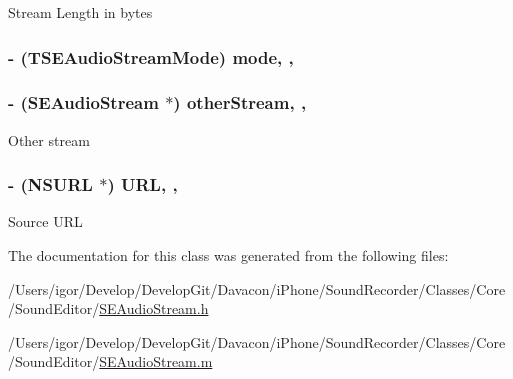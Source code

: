 Stream Length in bytes \hypertarget{interface_s_e_audio_stream_afde89d08f02ae01b1e9be3905942fb31}{
\subsubsection[{mode}]{\setlength{\rightskip}{0pt plus 5cm}-\/ ({\bf T\-S\-E\-Audio\-Stream\-Mode}) mode\hspace{0.3cm}{\ttfamily [read]}, {\ttfamily [nonatomic]}, {\ttfamily [assign]}}}\label{interface_s_e_audio_stream_afde89d08f02ae01b1e9be3905942fb31}
\hypertarget{interface_s_e_audio_stream_ac810584c028fe50e48e7fbbef9a7e4c7}{
\subsubsection[{other\-Stream}]{\setlength{\rightskip}{0pt plus 5cm}-\/ ({\bf S\-E\-Audio\-Stream} $\ast$) other\-Stream\hspace{0.3cm}{\ttfamily [read]}, {\ttfamily [nonatomic]}, {\ttfamily [assign]}}}\label{interface_s_e_audio_stream_ac810584c028fe50e48e7fbbef9a7e4c7}
Other stream \hypertarget{interface_s_e_audio_stream_ad987b7c1430970636c8d041b018e4a64}{
\subsubsection[{U\-R\-L}]{\setlength{\rightskip}{0pt plus 5cm}-\/ (N\-S\-U\-R\-L $\ast$) U\-R\-L\hspace{0.3cm}{\ttfamily [read]}, {\ttfamily [nonatomic]}, {\ttfamily [assign]}}}\label{interface_s_e_audio_stream_ad987b7c1430970636c8d041b018e4a64}
Source U\-R\-L 

The documentation for this class was generated from the following files\-:\begin{DoxyCompactItemize}
\item 
/\-Users/igor/\-Develop/\-Develop\-Git/\-Davacon/i\-Phone/\-Sound\-Recorder/\-Classes/\-Core/\-Sound\-Editor/\hyperlink{_s_e_audio_stream_8h}{S\-E\-Audio\-Stream.\-h}\item 
/\-Users/igor/\-Develop/\-Develop\-Git/\-Davacon/i\-Phone/\-Sound\-Recorder/\-Classes/\-Core/\-Sound\-Editor/\hyperlink{_s_e_audio_stream_8m}{S\-E\-Audio\-Stream.\-m}\end{DoxyCompactItemize}
